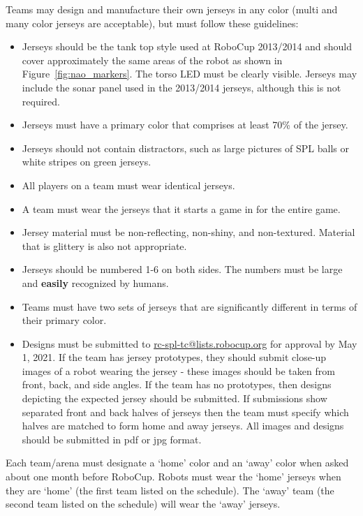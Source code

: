 Teams may design and manufacture their own jerseys in any color (multi and many color jerseys are acceptable), but must follow these guidelines:
\begin{itemize}
	\item Jerseys should be the tank top style used at RoboCup 2013/2014 and should cover approximately the same areas of the robot as shown in Figure~\ref{fig:nao_markers}.  The torso LED must be clearly visible.  Jerseys may include the sonar panel used in the 2013/2014 jerseys, although this is not required.
	\item Jerseys must have a primary color that comprises at least 70\% of the jersey.
	\item Jerseys should not contain distractors, such as large pictures of SPL balls or white stripes on green jerseys.
	\item All players on a team must wear identical jerseys.
	\item A team must wear the jerseys that it starts a game in for the entire game.
	\item Jersey material must be non-reflecting, non-shiny, and non-textured.  Material that is glittery is also not appropriate.
	\item Jerseys should be numbered 1-6 on both sides.  The numbers must be large and {\bf easily} recognized by humans.
	\item Teams must have two sets of jerseys that are significantly different in terms of their primary color.
	\item Designs must be submitted to \url{rc-spl-tc@lists.robocup.org} for approval by May 1, 2021. If the team has jersey prototypes, they should submit close-up images of a robot wearing the jersey - these images should be taken from front, back, and side angles.  If the team has no prototypes, then designs depicting the expected jersey should be submitted.  If submissions show separated front and back halves of jerseys then the team must specify which halves are matched to form home and away jerseys.  All images and designs should be submitted in pdf or jpg format.
\end{itemize}

Each team/arena must designate a `home' color and an `away' color when asked about one month before RoboCup. Robots must wear the `home' jerseys when they are `home' (the first team listed on the schedule). The `away' team (the second team listed on the schedule) will wear the `away' jerseys.

